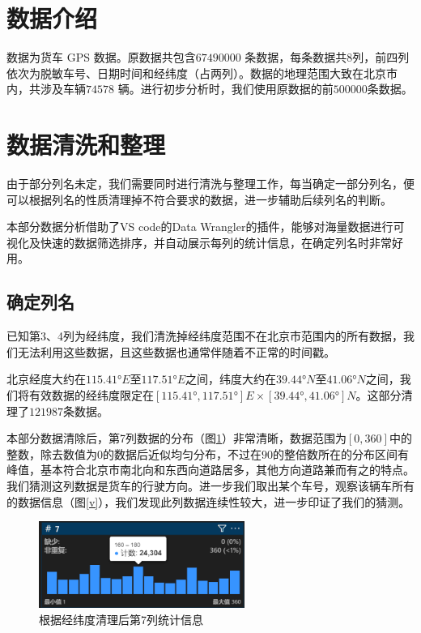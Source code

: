 \documentclass[UTF8]{ctexart}
\begin{document}
\section{数据介绍}

数据为货车 GPS 数据。原数据共包含$67490000$ 条数据，每条数据共8列，前四列依次为脱敏车号、日期时间和经纬度（占两列）。数据的地理范围大致在北京市内，共涉及车辆$74578$ 辆。进行初步分析时，我们使用原数据的前$500000$条数据。

\section{数据清洗和整理}

由于部分列名未定，我们需要同时进行清洗与整理工作，每当确定一部分列名，便可以根据列名的性质清理掉不符合要求的数据，进一步辅助后续列名的判断。

本部分数据分析借助了VS code的Data Wrangler的插件，能够对海量数据进行可视化及快速的数据筛选排序，并自动展示每列的统计信息，在确定列名时非常好用。

\subsection{确定列名}

已知第3、4列为经纬度，我们清洗掉经纬度范围不在北京市范围内的所有数据，我们无法利用这些数据，且这些数据也通常伴随着不正常的时间戳。

北京经度大约在$115.41°E$至$117.51°E$之间，纬度大约在$39.44°N$至$41.06°N$之间，我们将有效数据的经纬度限定在$[115.41°,117.51°]E\times [39.44°, 41.06°]N$。这部分清理了$121987$条数据。

本部分数据清除后，第7列数据的分布（图\ref{7-stat}）非常清晰，数据范围为$[0,360]$中的整数，除去数值为$0$的数据后近似均匀分布，不过在$90$的整倍数所在的分布区间有峰值，基本符合北京市南北向和东西向道路居多，其他方向道路兼而有之的特点。我们猜测这列数据是货车的行驶方向。进一步我们取出某个车号，观察该辆车所有的数据信息（图\ref{v}），我们发现此列数据连续性较大，进一步印证了我们的猜测。

\begin{figure}[!htb]
    \centering
    \includegraphics[width = 0.6\textwidth]{../img/pre/7列统计信息.png}
    \caption{根据经纬度清理后第7列统计信息}
    \label{7-stat}
\end{figure}
\end{document}
